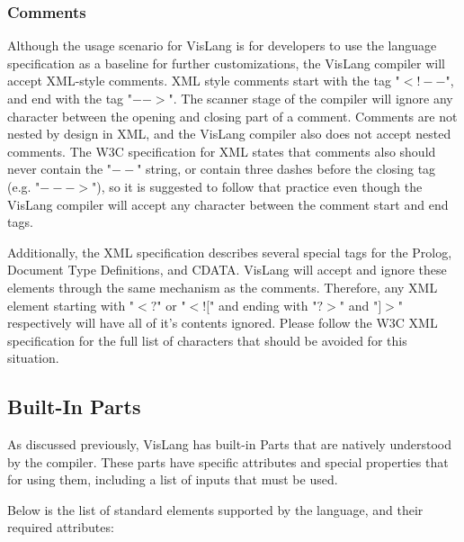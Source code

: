 \subsubsection{Comments}
Although the usage scenario for VisLang is for developers to use the language specification as a baseline for further customizations, the VisLang compiler will accept XML-style comments.
XML style comments start with the tag "$<!--$", and end with the tag "$-->$".
The scanner stage of the compiler will ignore any character between the opening and closing part of a comment.
Comments are not nested by design in XML, and the VisLang compiler also does not accept nested comments.
The W3C specification for XML states that comments also should never contain the "$--$" string, or contain three dashes before the closing tag (e.g. "$--->$"), so it is suggested to follow that practice even though the VisLang compiler will accept any character between the comment start and end tags.
\par
Additionally, the XML specification describes several special tags for the Prolog, Document Type Definitions, and CDATA.
VisLang will accept and ignore these elements through the same mechanism as the comments.
Therefore, any XML element starting with "$<?$" or "$<![$" and ending with "$?>$" and "$]>$" respectively will have all of it's contents ignored.
Please follow the W3C XML specification for the full list of characters that should be avoided for this situation.

\subsection{Built-In Parts}
As discussed previously, VisLang has built-in Parts that are natively understood by the compiler.
These parts have specific attributes and special properties that for using them, including a list of inputs that must be used.
\par
Below is the list of standard elements supported by the language, and their required attributes:

